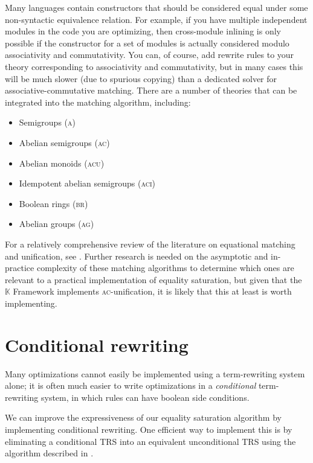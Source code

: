 \documentclass[11pt]{report}
\newcommand{\mbb}[1]{\ensuremath{\mathbb{#1}}}     %
\begin{document}
Many languages contain constructors that should be considered equal under some
non-syntactic equivalence relation. For example, if you have multiple
independent modules in the code you are optimizing, then cross-module inlining
is only possible if the constructor for a set of modules is actually considered
modulo associativity and commutativity. You can, of course, add rewrite rules
to your theory corresponding to associativity and commutativity, but in many
cases this will be much slower (due to spurious copying) than a dedicated solver
for associative-commutative matching. There are a number of theories that can
be integrated into the matching algorithm, including:

\begin{itemize}
\item Semigroups (\textsc{a})
\item Abelian semigroups (\textsc{ac})
\item Abelian monoids (\textsc{acu})
\item Idempotent abelian semigroups (\textsc{aci})
\item Boolean rings (\textsc{br})
\item Abelian groups (\textsc{ag})
\end{itemize}

For a relatively comprehensive review of the literature on equational matching
and unification, see \cite{siekmann-1989}. Further research is needed on the
asymptotic and in-practice complexity of these matching algorithms to determine
which ones are relevant to a practical implementation of equality saturation,
but given that the $\mbb{K}$ Framework implements \textsc{ac}-unification, it is
likely that this at least is worth implementing.

\section{Conditional rewriting}
\label{sec:conditional-rewriting}

Many optimizations cannot easily be implemented using a term-rewriting system
alone; it is often much easier to write optimizations in a \textit{conditional}
term-rewriting system, in which rules can have boolean side conditions.

We can improve the expressiveness of our equality saturation algorithm by
implementing conditional rewriting. One efficient way to implement this is by
eliminating a conditional TRS into an equivalent unconditional TRS using the
algorithm described in \cite{rosu-2005}.
\end{document}
